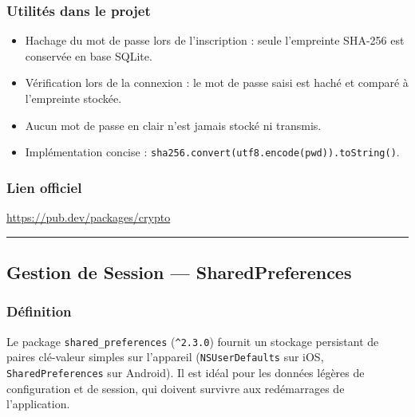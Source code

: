 \documentclass[12pt,a4paper]{report}
\begin{document}
\subsubsection*{Utilités dans le projet}
\begin{itemize}
  \item Hachage du mot de passe lors de l'inscription : seule l'empreinte SHA-256 est conservée en base SQLite.
  \item Vérification lors de la connexion : le mot de passe saisi est haché et comparé à l'empreinte stockée.
  \item Aucun mot de passe en clair n'est jamais stocké ni transmis.
  \item Implémentation concise : \texttt{sha256.convert(utf8.encode(pwd)).toString()}.
\end{itemize}

\subsubsection*{Lien officiel}
\url{https://pub.dev/packages/crypto}

\medskip\hrule\medskip

\subsection{Gestion de Session --- SharedPreferences}

\noindent\begin{minipage}[t]{0.66\textwidth}
\subsubsection*{Définition}
Le package \texttt{shared\_preferences} (\texttt{\^{}2.3.0}) fournit un stockage persistant de paires clé-valeur simples sur l'appareil (\texttt{NSUserDefaults} sur iOS, \texttt{SharedPreferences} sur Android). Il est idéal pour les données légères de configuration et de session, qui doivent survivre aux redémarrages de l'application.
\end{minipage}\hfill
\begin{minipage}[t]{0.30\textwidth}
\vspace{0pt}
\begin{center}
\end{center}
\end{minipage}
\end{document}
